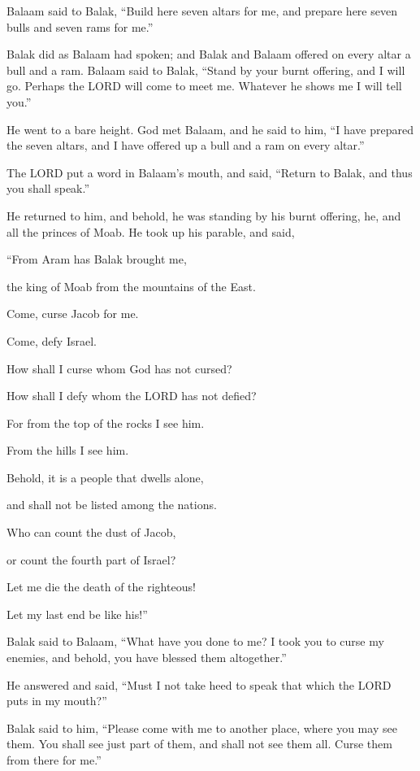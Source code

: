 \mychapter{} \myverse*{}Balaam said to Balak, “Build here seven altars for me, and prepare
here seven bulls and seven rams for me.”


\myverse{}Balak did as Balaam had spoken; and Balak and Balaam offered on
every altar a bull and a ram.
\myverse{}Balaam said to Balak, “Stand by your burnt offering, and I will go. Perhaps
the LORD will come to meet me. Whatever he shows me I will tell you.”

He went to a bare height.
\myverse{}God met Balaam, and he said to him, “I have prepared the seven altars, and
I have offered up a bull and a ram on every altar.”


\myverse{}The LORD put a word in Balaam’s mouth, and said, “Return to Balak,
and thus you shall speak.”


\myverse{}He returned to him, and behold, he was standing by his burnt offering,
he, and all the princes of Moab.
\myverse{}He took up his parable, and said,

“From Aram has Balak brought me,

the king of Moab from the mountains of the East.

Come, curse Jacob for me.

Come, defy Israel.


\myverse{}How shall I curse whom God has not cursed?

How shall I defy whom the LORD has not defied?


\myverse{}For from the top of the rocks I see him.

From the hills I see him.

Behold, it is a people that dwells alone,

and shall not be listed among the nations.


\myverse{}Who can count the dust of Jacob,

or count the fourth part of Israel?

Let me die the death of the righteous!

Let my last end be like his!”


\myverse{}Balak said to Balaam, “What have you done to me? I took you
to curse my enemies, and behold, you have blessed them altogether.”


\myverse{}He answered and said, “Must I not take heed to speak that which
the LORD puts in my mouth?”


\myverse{}Balak said to him, “Please come with me to another place, where
you may see them. You shall see just part of them, and shall not see them all. Curse them from there for
me.”


